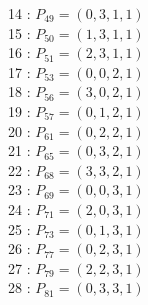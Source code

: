 \documentclass{article}
\begin{document}
{\begin{multicols}{3}
14 : $P_{49}=( 0, 3, 1, 1 )$\\
15 : $P_{50}=( 1, 3, 1, 1 )$\\
16 : $P_{51}=( 2, 3, 1, 1 )$\\
17 : $P_{53}=( 0, 0, 2, 1 )$\\
18 : $P_{56}=( 3, 0, 2, 1 )$\\
19 : $P_{57}=( 0, 1, 2, 1 )$\\
20 : $P_{61}=( 0, 2, 2, 1 )$\\
21 : $P_{65}=( 0, 3, 2, 1 )$\\
22 : $P_{68}=( 3, 3, 2, 1 )$\\
23 : $P_{69}=( 0, 0, 3, 1 )$\\
24 : $P_{71}=( 2, 0, 3, 1 )$\\
25 : $P_{73}=( 0, 1, 3, 1 )$\\
26 : $P_{77}=( 0, 2, 3, 1 )$\\
27 : $P_{79}=( 2, 2, 3, 1 )$\\
28 : $P_{81}=( 0, 3, 3, 1 )$\\
\end{multicols}


%


%


}%
\end{document}
